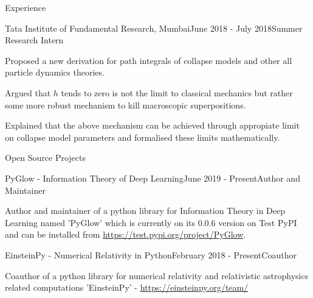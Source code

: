 \documentclass{resume} %
\begin{document}
\begin{rSection}{Experience}
\begin{rSubsection}{Tata Institute of Fundamental Research, Mumbai}{June 2018 - July 2018}{Summer Research Intern}{}
\item Proposed a new derivation for path integrals of collapse models and other all particle dynamics theories.
\item Argued that $h$ tends to zero is not the limit to classical mechanics but rather some more robust mechanism to kill macroscopic superpositions.
\item Explained that the above mechanism can be achieved through appropiate limit on collapse model parameters and formalised these limits mathematically.
\end{rSubsection}

\end{rSection}

\begin{rSection}{Open Source Projects}

\begin{rSubsection}{PyGlow - Information Theory of Deep Learning}{June 2019 - Present}{Author and Maintainer}{}
\item Author and maintainer of a python library for Information Theory in Deep Learning named 'PyGlow' which is currently on its 0.0.6 version on Test PyPI and can be installed from \url{https://test.pypi.org/project/PyGlow}.
\end{rSubsection}
\begin{rSubsection}{EinsteinPy - Numerical Relativity in Python}{February 2018 - Present}{Coauthor}{}
\item Coauthor of a python library for numerical relativity and relativistic astrophysics related computations 'EinsteinPy' - \url{https://einsteinpy.org/team/}
\end{rSubsection}

\end{rSection}
\end{document}
